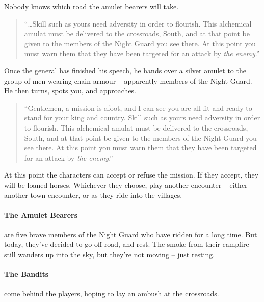 Nobody knows which road the amulet bearers will take.

\begin{boxtext}
	\begin{quotation}
	``\ldots Skill such as yours need adversity in order to flourish.  This alchemical amulat must be delivered to the crossroads, South, and at that point be given to the members of the Night Guard you see there.  At this point you must warn them that they have been targeted for an attack by \emph{the enemy}.''
	\end{quotation}

Once the general has finished his speech, he hands over a silver amulet to the group of men wearing chain armour -- apparently members of the Night Guard.  He then turns, spots you, and approaches.

	\begin{quotation}
	``Gentlemen, a mission is afoot, and I can see you are all fit and ready to stand for your king and country.  Skill such as yours need adversity in order to flourish.  This alchemical amulat must be delivered to the crossroads, South, and at that point be given to the members of the Night Guard you see there.  At this point you must warn them that they have been targeted for an attack by \emph{the enemy}.''
	\end{quotation}

\end{boxtext}

At this point the characters can accept or refuse the mission.  If they accept, they will be loaned horses.  Whichever they choose, play another encounter -- either another town encounter, or as they ride into the villages.

\paragraph{The Amulet Bearers} are five brave members of the Night Guard who have ridden for a long time.  But today, they've decided to go off-road, and rest.  The smoke from their campfire still wanders up into the sky, but they're not moving -- just resting.

\humansoldier

\paragraph{The Bandits} come behind the players, hoping to lay an ambush at the crossroads.

